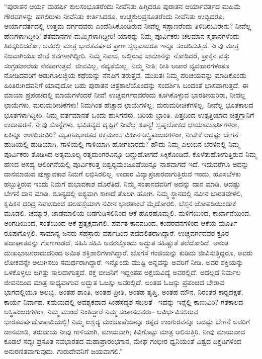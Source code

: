  “ಪುರಾತನ ಆರ್ಯ ಮಹರ್ಷಿ ಕುಲಸಂಭೂತರೆಂದು ನೀವೆನಿತು ಹಿಗ್ಗಿದರೂ ಪುರಾತನ ಆರ್ಯಾವರ್ತದ ಮಹಿಮೆ ಗೌರವಗಳನ್ನು ಹಗಲಿರುಳು ನೀವೆನಿತು ಕೀರ್ತಿಸಿದರೂ, ಉಚ್ಚಕುಲಪ್ರಸೂತರೆಂದು ನೀವೆನಿತು ಉಬ್ಬಿದರೂ, ಆರ್ಯಾವರ್ತದಲ್ಲಿ ಉತ್ತಮ ವರ್ಗದವರು ಎಂದೆನಿಸಿಕೊಂಡಿರುವ ನೀವೆಲ್ಲ ಸಪ್ರಾಣರೆಂದು ತಿಳಿದಿರುವಿರೇನು? ನೀವೆಲ್ಲ ಹೆಣಗಳಾಗಿದ್ದೀರಿ! ಶತಮಾನಗಳ ಮಮ್ಮಿಗಳಾಗಿದ್ದೀರಿ! ಯಾರನ್ನು ನಿಮ್ಮ ಪೂರ್ವಿಕರು ಚಲಮಾನ ಸ್ಮಶಾನಗಳೆಂದು ತಿರಸ್ಕರಿಸಿದರೋ, ಅವರಲ್ಲಿ ಮಾತ್ರ ಭಾರತವರ್ಷದ ಪ್ರಾಣ ಸ್ವಲ್ಪವಾದರೂ ಇನ್ನೂ ಸಂಚರಿಸುತ್ತಿದೆ. ನೀವು ಮಾತ್ರ ನಿಜವಾಗಿಯೂ ಜೀವ ಶವಗಳಾಗಿದ್ದೀರಿ. ನಿಮ್ಮ ನಿವಾಸ, ಅಲ್ಲಿರುವ ಸಾಮಾನನ್ನು ನೋಡಿದರೆ, ಪ್ರಾಕ್ತನ ವಸ್ತು ಸಂಗ್ರಹಶಾಲೆಯ ನೆನಪಾಗುತ್ತದೆ. ಜೀವವಿಲ್ಲ, ನವ್ಯತೆಯಿಲ್ಲ. ನಿಮ್ಮ ನೀತಿ, ರೀತಿ ಆಚಾರ ವ್ಯವಹಾರಗಳಂತೂ ನೋಡಿದವರಿಗೆ ಅಡುಗೂಲಜ್ಜಿಯ ಕಥೆಯನ್ನು ನೆನಪಿಗೆ ತರುತ್ತವೆ. ಮುಖತಃ ನಿಮ್ಮ ಪರಿಚಯವನ್ನು ಮಾಡಿಕೊಂಡು ಹಿಂತಿರುಗಿದವನಿಗೆ ಯಾವುದೋ ಬಹು ಪುರಾತನ ಚಿತ್ರಶಾಲೆಯೊಂದನ್ನು ಸಂದರ್ಶಿಸಿ ಬಂದಂತೆ ಭಾಸವಾಗುತ್ತದೆ. ಈ ಮಾಯಾ ಪ್ರಪಂಚದಲ್ಲಿ ಮಾಯೆಗಳೆಂದರೆ ನೀವೆ! ಉಚ್ಚವರ್ಗದವರೆಂದು ಕೂಗಿಕೊಳ್ಳುವ ಭಾರತೀಯರಿರಾ, ನೀವೆಲ್ಲ ಛಾಯೆಗಳು, ಮರುಮರೀಚಿಕೆಗಳು! ನಿಮಗಿಂತ ಹೆಚ್ಚಾದ ಛಾಯೆಗಳಿಲ್ಲ; ಮರುಮರೀಚಿಕೆಗಳಿಲ್ಲ. ನೀವೆಲ್ಲ ಭೂತಕಾಲದ ಭೂತಗಳಾಗಿದ್ದೀರಿ. ನಿಮ್ಮ ವರ್ತಮಾನತೆ ಒಂದು ಹುಸಿಗನಸು, ಬರಿಯ ಭ್ರಾಂತಿ. ಪಿತ್ತದಿಂದ ಉತ್ಪತ್ತಿಯಾದ ಚಿತ್ತಗ್ಲಾನಿಗೆ ಉದಾಹರಣೆ. ನೀವು ಸೊನ್ನೆಗಳು. ಭವಿತವ್ಯದ ದೃಷ್ಟಿಗೆ ನೀವೆಲ್ಲ ಶೂನ್ಯ! ಸ್ವಪ್ನಲೋಕದ ಛಾಯಾಮೂರ್ತಿಗಳಿರಾ, ಏಕಿನ್ನೂ ಉಳಿದಿರುವಿರಿ? ಮೃತಗತಭಾರತದ ರಕ್ತಮಾಂಸ ವಿಹೀನ ಅಸ್ಥಿಪಂಜರಗಳಿರಾ, ನೀವೇಕೆ ಆದಷ್ಟು ಬೇಗನೆ ಹುಡಿಯಲ್ಲಿ ಹುಡಿಯಾಗಿ, ಗಾಳಿಯಲ್ಲಿ ಗಾಳಿಯಾಗಿ ಹೋಗಬಾರದು? ಹೌದು ನಿಮ್ಮ ಎಲುಬಿನ ಬೆರಳಿನಲ್ಲಿ ನಿಮ್ಮ ಪೂರ್ವಿಕರು ತೊಡಿಸಿದ ಅತ್ಯಮೂಲ್ಯ ರತ್ನದುಂಗರವಿನ್ನೂ ಬಿದ್ದುಹೋಗದೆ ಸಿಕ್ಕಿಕೊಂಡಿದೆ. ಕೊಳೆತುಹೋಗುತ್ತಿರುವ ನಿಮ್ಮ ಹೆಣದ ಅಸಹ್ಯ ಆಲಿಂಗನೆಯಲ್ಲಿ ಪೂರ್ವಿಕರಿತ್ತ ಐಶ್ವರ‍್ಯಮಂಜೂಷೆಯಿನ್ನೂ ನಾಶವಾಗದೆ ಇದೆ. ಇದುವರೆಗೂ ಅದನ್ನು ದಾನಮಾಡುವ ಪುಣ್ಯಾವಕಾಶ ನಿಮಗೆ ಲಭಿಸಿರಲಿಲ್ಲ. ಉದಾರ ವಿದ್ಯಾಪ್ರಚಾರವಾಗುತ್ತಿರುವ ಇಂದು, ಹೊಸಬೆಳಕು ಹಬ್ಬುತ್ತಿರುವ ಇಂದು ನಿಮಗೆ ಶುಭಾವಕಾಶ ದೊರೆತಿದೆ. ನಿಮ್ಮ ಸಂತಾನದವರಿಗೆ ಅದನ್ನು ದಾನ ಮಾಡಿ. ಆದಷ್ಟು ಬೇಗನೆ ದಾನ ಮಾಡಿ. ಶೂನ್ಯದಲ್ಲಿ ಐಕ್ಯವಾಗಿ ಕಾಣದೆ ತೊಲಗಿ ಹೋಗಿ. ನಿಮ್ಮ ಸ್ಥಾನದಲ್ಲಿ ನವೀನ ಭಾರತವೇಳಲಿ, ಕೃಷಿಕನ ದರಿದ್ರ ನಿವಾಸದಿಂದ ಹಲಹಸ್ತೆಯಾಗಿ ನವೀನ ಭಾರತಾಂಬೆ ಮೈದೋರಲಿ. ಬೆಸ್ತನ ಜೋಪಡಿಯಿಂದಾಕೆ ಮೂಡಲಿ. ಚಮ್ಮಾರ, ಜಾಡಮಾಲಿಯ ಬಡಗುಡಿಸಲಿನಿಂದ ಆಕೆ ಹೊರಹೊಮ್ಮಲಿ. ಮಳಿಗೆಯಿಂದ, ಕಾರ್ಖಾನೆಯಿಂದ, ಅಂಗಡಿಯಿಂದ, ಸಂತೆಯಿಂದ ಆಕೆ ಪ್ರತ್ಯಕ್ಷವಾಗಲಿ. ಪರ್ವತ ಕಾನನದಿಂದ, ಕಂದರವನಗಳಿಂದ ಆಕೆಯ ಮೂರ್ತಿ ರೂಪುಗೊಳ್ಳಲಿ. ಸಾಮಾನ್ಯ ಜನರು ಸಹಸ್ರಾರು ವರ್ಷದಿಂದ ಪದದಲಿತರಾಗಿದ್ದಾರೆ. ಉಚ್ಚವರ್ಗದವರ ಕ್ರೂರ ಪದಾಘಾತವನ್ನು ಗೊಣಗಾಡದೆ, ಸಹಿಸಿ ಸಹಿಸಿ ಅವರಲ್ಲೊಂದು ಅದ್ಭುತ ಸಹಿಷ್ಣುತೆ ತಲೆದೋರಿದೆ. ಅನಂತ ದುಃಖಭಾಜನರಾದುದರಿಂದ ಅಮಿತ ಶಕ್ತಿಶಾಲಿಗಳಾಗಿದ್ದಾರೆ. ಬೊಗಸೆ ಗಂಜಿಯನ್ನು ಕುಡಿದು ಜೀವಿಸುತ್ತಿದ್ದರೂ, ಅವರು ಲೋಕವನ್ನೇ ಅಲುಗಿಸಲು ಸಮರ್ಥರಾಗಿದ್ದಾರೆ. ಇನ್ನೊಂದು ಮುಷ್ಟಿ ಅನ್ನವನ್ನು ಅವರಿಗೆ ನೀಡಿ. ಅವರ ಶಕ್ತಿಯನ್ನು ಒಳಕೊಳ್ಳಲು ಜಗತ್ತು ಸಾಲದಾಗುತ್ತದೆ. ರಕ್ತ ಬೀಜನಿಗೆ ಇದ್ದಂತಹ ಅಕ್ಷಯವಿದ್ಯೆ ಅವರಲ್ಲಿದೆ. ಅದಲ್ಲದೆ ನಿರ್ಮಲ ಜೀವನದಿಂದ ಮಾತ್ರ ಸಾಧ್ಯವಾಗುವ ಅದ್ಭುತ ಓಜಸ್ಸು ಅವರಲ್ಲಿದೆ. ಅಂತಹ ಓಜಸ್ಸು ಪ್ರಪಂಚದ ಬೇರಾವ ಭಾಗದಲ್ಲಿಯೂ ಅಲಭ್ಯ. ಅಂತಹ ಶಾಂತಿ, ಅಂತಹ ಪ್ರೀತಿ, ಅಂತಹ ತೃಪ್ತಿ, ಅಂತಹ ಮೌನ, ನಿರಂತರ ಕಾರ‍್ಯದಕ್ಷತೆ, ಕಾರ್ಯ ನಿರ್ವಾಹ, ಸಮಯದಲ್ಲಿ ಅವಶ್ಯಕವಾದ ಸಿಂಹಸದೃಶ ಸಬಲತೆ– ಇದನ್ನು ಇನ್ನೆಲ್ಲಿ ಕಾಣುವಿರಿ? ಗತಕಾಲದ ಅಸ್ಥಿಪಂಜರಗಳಿರಾ, ನಿಮ್ಮ ಮುಂದೆ ನಿಂತಿದ್ದಾರೆ ನಿಮ್ಮ ಸಂತಾನದವರು– ಆವಿರ್ಭವಿಸಲಿರುವ ಭಾರತವರ್ಷದೋಪಾದಿಯಲ್ಲಿ! ನಿಮ್ಮ ಐಶ್ವರ‍್ಯ ಮಂಜೂಷೆಯನ್ನೂ ರತ್ನದ ಉಂಗುರವನ್ನೂ ಆದಷ್ಟು ಬೇಗನೆ ಅವರಿಗೆ ದಾನಮಾಡಿ, ತರುವಾಯ ನೀವು ಗಾಳಿಯಾಗಿ, ಮಾಯವಾಗಿ; ಕಿವಿಗೊಟ್ಟು ಮಾತ್ರ ಆಲಿಸುತ್ತಿರಿ. ನೀವು ಮಾಯವಾದ ಕೂಡಲೆ ಸದ್ಯಃ ಪ್ರಸೂತ ನವಭಾರತದ ಮಹಾಪ್ರಾರಂಭಗಾನ, ಮೇಘ ಗಂಭೀರ ಧ್ವನಿಯಂತೆ ವಿಶ್ವದ ದಿಕ್ತಟಗಳಿಂದ ಅನುರಣಿತವಾಗುವುದು. ಗುರುದೇವನಿಗೆ ಜಯವಾಗಲಿ.” 

